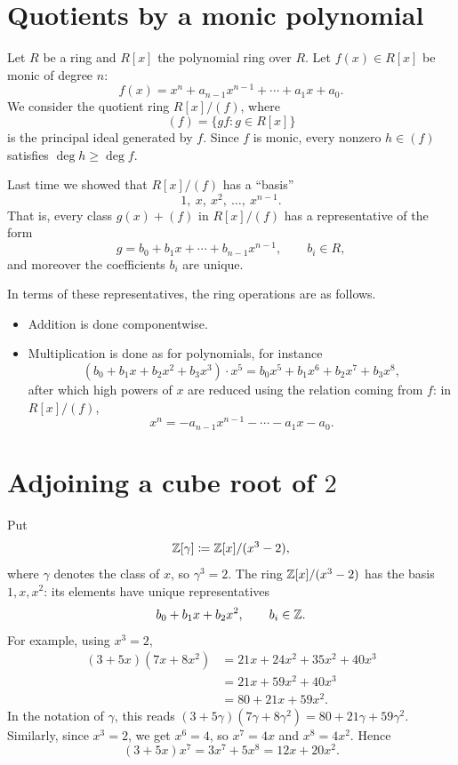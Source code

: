 \documentclass[reqno,11pt]{amsart}
\begin{document}
\raggedbottom
\makelecturetitle



\section{Quotients by a monic polynomial}

Let $R$ be a ring and $R[x]$ the polynomial ring over $R$.
Let $f(x)\in R[x]$ be monic of degree $n$:
\[
  f(x)=x^n+a_{n-1}x^{n-1}+\cdots+a_1x+a_0 .
\]
We consider the quotient ring $R[x]/(f)$, where
\[
  (f)=\{gf: g\in R[x]\}
\]
is the principal ideal generated by $f$. Since $f$ is monic, every
nonzero $h\in(f)$ satisfies $\deg h\geq\deg f$.

Last time we showed that $R[x]/(f)$ has a ``basis''
\[
  1,\ x,\ x^2,\ \dots,\ x^{n-1}.
\]
That is, every class $g(x)+(f)$ in $R[x]/(f)$ has a representative of
the form
\[
  g=b_0+b_1x+\cdots+b_{n-1}x^{n-1},\qquad b_i\in R,
\]
and moreover the coefficients $b_i$ are unique.

In terms of these representatives, the ring operations are as follows.
\begin{itemize}
  \item Addition is done componentwise.
  \item Multiplication is done as for polynomials, for instance
  \[
    (b_0+b_1x+b_2x^2+b_3x^3)\cdot x^5
    =b_0x^5+b_1x^6+b_2x^7+b_3x^8,
  \]
  after which high powers of $x$ are reduced using the relation
  coming from $f$: in $R[x]/(f)$,
  \[
    x^n=-a_{n-1}x^{n-1}-\cdots-a_1x-a_0 .
  \]
\end{itemize}

\section{Adjoining a cube root of \texorpdfstring{$2$}{2}}

\begin{example}
Put
\[
  \mathbb{Z}[\gamma]\coloneqq\mathbb{Z}[x]/(x^3-2),
\]
where $\gamma$ denotes the class of $x$, so $\gamma^3=2$.
The ring $\mathbb{Z}[x]/(x^3-2)$ has the basis $1,x,x^2$: its elements have
unique representatives
\[
  b_0+b_1x+b_2x^2,\qquad b_i\in\mathbb{Z}.
\]
For example, using $x^3=2$,
\begin{align*}
  (3+5x)(7x+8x^2)
  &=21x+24x^2+35x^2+40x^3\\
  &=21x+59x^2+40x^3\\
  &=80+21x+59x^2 .
\end{align*}
In the notation of $\gamma$, this reads
$(3+5\gamma)(7\gamma+8\gamma^2)=80+21\gamma+59\gamma^2$.
Similarly, since $x^3=2$, we get $x^6=4$, so $x^7=4x$ and
$x^8=4x^2$. Hence
\[
  (3+5x)x^7=3x^7+5x^8=12x+20x^2 .
\]
\end{example}
\end{document}
